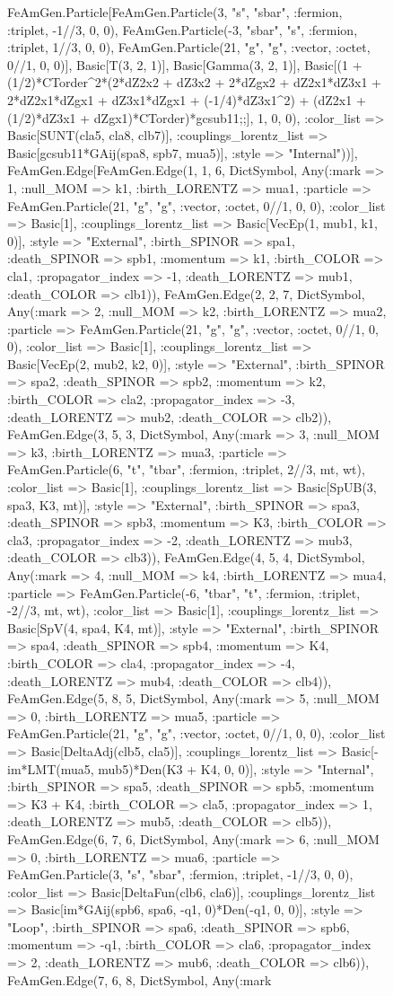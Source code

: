 \documentclass{revtex4}
\begin{document}
\begin{figure}[!htb]
\begin{center}
{FeAmGen.Particle[FeAmGen.Particle(3, "s", "sbar", :fermion, :triplet, -1//3, 0, 0), FeAmGen.Particle(-3, "sbar", "s", :fermion, :triplet, 1//3, 0, 0), FeAmGen.Particle(21, "g", "g", :vector, :octet, 0//1, 0, 0)], Basic[T(3, 2, 1)], Basic[Gamma(3, 2, 1)], Basic[(1 + (1/2)*CTorder^2*(2*dZ2x2 + dZ3x2 + 2*dZgx2 + dZ2x1*dZ3x1 + 2*dZ2x1*dZgx1 + dZ3x1*dZgx1 + (-1/4)*dZ3x1^2) + (dZ2x1 + (1/2)*dZ3x1 + dZgx1)*CTorder)*gcsub11;;], 1, 0, 0), :color_list => Basic[SUNT(cla5, cla8, clb7)], :couplings_lorentz_list => Basic[gcsub11*GAij(spa8, spb7, mua5)], :style => "Internal"))], FeAmGen.Edge[FeAmGen.Edge(1, 1, 6, Dict{Symbol, Any}(:mark => 1, :null_MOM => k1, :birth_LORENTZ => mua1, :particle => FeAmGen.Particle(21, "g", "g", :vector, :octet, 0//1, 0, 0), :color_list => Basic[1], :couplings_lorentz_list => Basic[VecEp(1, mub1, k1, 0)], :style => "External", :birth_SPINOR => spa1, :death_SPINOR => spb1, :momentum => k1, :birth_COLOR => cla1, :propagator_index => -1, :death_LORENTZ => mub1, :death_COLOR => clb1)), FeAmGen.Edge(2, 2, 7, Dict{Symbol, Any}(:mark => 2, :null_MOM => k2, :birth_LORENTZ => mua2, :particle => FeAmGen.Particle(21, "g", "g", :vector, :octet, 0//1, 0, 0), :color_list => Basic[1], :couplings_lorentz_list => Basic[VecEp(2, mub2, k2, 0)], :style => "External", :birth_SPINOR => spa2, :death_SPINOR => spb2, :momentum => k2, :birth_COLOR => cla2, :propagator_index => -3, :death_LORENTZ => mub2, :death_COLOR => clb2)), FeAmGen.Edge(3, 5, 3, Dict{Symbol, Any}(:mark => 3, :null_MOM => k3, :birth_LORENTZ => mua3, :particle => FeAmGen.Particle(6, "t", "tbar", :fermion, :triplet, 2//3, mt, wt), :color_list => Basic[1], :couplings_lorentz_list => Basic[SpUB(3, spa3, K3, mt)], :style => "External", :birth_SPINOR => spa3, :death_SPINOR => spb3, :momentum => K3, :birth_COLOR => cla3, :propagator_index => -2, :death_LORENTZ => mub3, :death_COLOR => clb3)), FeAmGen.Edge(4, 5, 4, Dict{Symbol, Any}(:mark => 4, :null_MOM => k4, :birth_LORENTZ => mua4, :particle => FeAmGen.Particle(-6, "tbar", "t", :fermion, :triplet, -2//3, mt, wt), :color_list => Basic[1], :couplings_lorentz_list => Basic[SpV(4, spa4, K4, mt)], :style => "External", :birth_SPINOR => spa4, :death_SPINOR => spb4, :momentum => K4, :birth_COLOR => cla4, :propagator_index => -4, :death_LORENTZ => mub4, :death_COLOR => clb4)), FeAmGen.Edge(5, 8, 5, Dict{Symbol, Any}(:mark => 5, :null_MOM => 0, :birth_LORENTZ => mua5, :particle => FeAmGen.Particle(21, "g", "g", :vector, :octet, 0//1, 0, 0), :color_list => Basic[DeltaAdj(clb5, cla5)], :couplings_lorentz_list => Basic[-im*LMT(mua5, mub5)*Den(K3 + K4, 0, 0)], :style => "Internal", :birth_SPINOR => spa5, :death_SPINOR => spb5, :momentum => K3 + K4, :birth_COLOR => cla5, :propagator_index => 1, :death_LORENTZ => mub5, :death_COLOR => clb5)), FeAmGen.Edge(6, 7, 6, Dict{Symbol, Any}(:mark => 6, :null_MOM => 0, :birth_LORENTZ => mua6, :particle => FeAmGen.Particle(3, "s", "sbar", :fermion, :triplet, -1//3, 0, 0), :color_list => Basic[DeltaFun(clb6, cla6)], :couplings_lorentz_list => Basic[im*GAij(spb6, spa6, -q1, 0)*Den(-q1, 0, 0)], :style => "Loop", :birth_SPINOR => spa6, :death_SPINOR => spb6, :momentum => -q1, :birth_COLOR => cla6, :propagator_index => 2, :death_LORENTZ => mub6, :death_COLOR => clb6)), FeAmGen.Edge(7, 6, 8, Dict{Symbol, Any}(:mark }
\end{center}
\end{figure}
\end{document}
